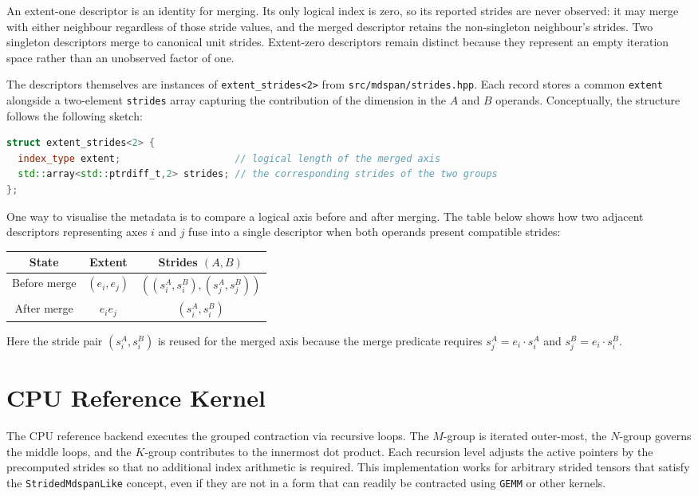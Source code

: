 \documentclass[11pt]{article}
\begin{document}
An extent-one descriptor is an identity for merging. Its only logical index is zero, so its
reported strides are never observed: it may merge with either neighbour regardless of those stride
values, and the merged descriptor retains the non-singleton neighbour's strides. Two singleton
descriptors merge to canonical unit strides. Extent-zero descriptors remain distinct because they
represent an empty iteration space rather than an unobserved factor of one.

The descriptors themselves are instances of \texttt{extent\_strides<2>} from
\texttt{src/mdspan/strides.hpp}.  Each record stores a common \texttt{extent} alongside a
two-element \texttt{strides} array capturing the contribution of the dimension in the $A$ and $B$
operands.  Conceptually, the structure follows the following sketch:

\begin{lstlisting}[language=C++]
struct extent_strides<2> {
  index_type extent;                    // logical length of the merged axis
  std::array<std::ptrdiff_t,2> strides; // the corresponding strides of the two groups
};
\end{lstlisting}

One way to visualise the metadata is to compare a logical axis before and after merging.  The table
below shows how two adjacent descriptors representing axes $i$ and $j$ fuse into a single descriptor
when both operands present compatible strides:

\begin{center}
\begin{tabular}{c|c|c}
  \textbf{State} & \textbf{Extent} & \textbf{Strides $(A,B)$} \\
  \hline
  Before merge & $(e_i, e_j)$ & $((s_i^A, s_i^B), (s_j^A, s_j^B))$ \\
  After merge  & $e_i e_j$ & $(s_i^A, s_i^B)$
\end{tabular}
\end{center}

Here the stride pair $(s_i^A, s_i^B)$ is reused for the merged axis because the merge predicate
requires $s_j^A = e_i \cdot s_i^A$ and $s_j^B = e_i \cdot s_i^B$.

\section{CPU Reference Kernel}
The CPU reference backend executes the grouped contraction via recursive loops.  The $M$-group is
iterated outer-most, the $N$-group governs the middle loops, and the $K$-group contributes to the
innermost dot product.  Each recursion level adjusts the active pointers by the precomputed strides
so that no additional index arithmetic is required.  This implementation
works for arbitrary strided tensors that satisfy the \texttt{StridedMdspanLike} concept, even if they are not in a
form that can readily be contracted using \texttt{GEMM} or other kernels.
\end{document}
